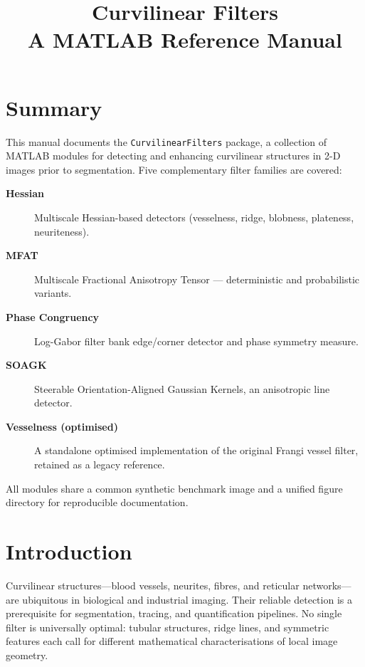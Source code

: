 \documentclass[a4paper,justified]{tufte-book}
\title{Curvilinear Filters\\[0.5em]\large A MATLAB Reference Manual}
\author{ }
\date{ }
\begin{document}
\maketitle
\tableofcontents
\newpage

\section{Summary}

This manual documents the \texttt{CurvilinearFilters} package, a collection of
MATLAB modules for detecting and enhancing curvilinear structures in 2-D images
prior to segmentation. Five complementary filter families are covered:

\begin{description}
  \item[\textbf{Hessian}] Multiscale Hessian-based detectors (vesselness, ridge,
        blobness, plateness, neuriteness).
  \item[\textbf{MFAT}] Multiscale Fractional Anisotropy Tensor --- deterministic
        and probabilistic variants.
  \item[\textbf{Phase Congruency}] Log-Gabor filter bank edge/corner detector
        and phase symmetry measure.
  \item[\textbf{SOAGK}] Steerable Orientation-Aligned Gaussian Kernels, an
        anisotropic line detector.
  \item[\textbf{Vesselness (optimised)}] A standalone optimised implementation
        of the original Frangi vessel filter, retained as a legacy reference.
\end{description}

All modules share a common synthetic benchmark image and a unified figure
directory for reproducible documentation.

\section{Introduction}

Curvilinear structures---blood vessels, neurites, fibres, and reticular
networks---are ubiquitous in biological and industrial imaging. Their
reliable detection is a prerequisite for segmentation, tracing, and
quantification pipelines. No single filter is universally optimal: tubular
structures, ridge lines, and symmetric features each call for different
mathematical characterisations of local image geometry.
\end{document}
